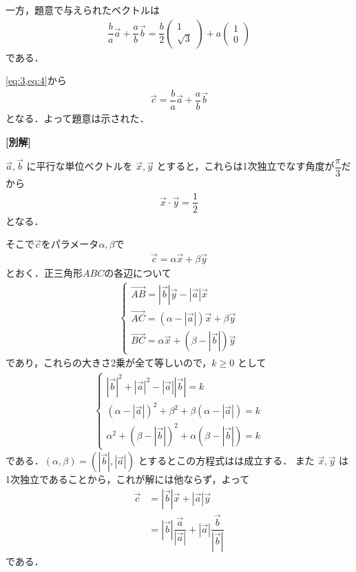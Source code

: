 \documentclass[../../main.tex]{subfiles}
\begin{document}
一方，題意で与えられたベクトルは
\begin{align}
  \dfrac{b}{a}\vec{a} + \dfrac{a}{b}\vec{b} = \dfrac{b}{2}
  \begin{pmatrix} 1 \\ \sqrt{3}
  \end{pmatrix} + a
  \begin{pmatrix} 1 \\ 0
  \end{pmatrix} \label{eq:4}
\end{align}
である．

\cref{eq:3,eq:4}から
\begin{align}
  \vec{c} = \dfrac{b}{a}\vec{a} + \dfrac{a}{b}\vec{b}
\end{align}
となる．よって題意は示された．

{\bf [別解]}

$\vec{a}, \vec{b}$ に平行な単位ベクトルを $\vec{x}, \vec{y}$ とすると，これらは1次独立でなす角度が$\dfrac{\pi}{3}$だから
\begin{align}
  \vec{x} \cdot \vec{y} = \dfrac{1}{2} \label{eq:5}
\end{align}
となる．

そこで$\vec{c}$をパラメータ$\alpha,\beta$で
\begin{align}
  \vec{c} = \alpha \vec{x} + \beta \vec{y}
\end{align}
とおく．正三角形$ABC$の各辺について
\begin{align}
  \begin{cases}
    \overrightarrow{AB} = |\vec{b}|\vec{y} - |\vec{a}|\vec{x} \\
    \overrightarrow{AC} = (\alpha - |\vec{a}|)\vec{x} + \beta \vec{y} \\
    \overrightarrow{BC} = \alpha \vec{x} + (\beta - |\vec{b}|)\vec{y}
  \end{cases}
\end{align}
であり，これらの大きさ2乗が全て等しいので，$k \ge 0$ として
\begin{align}
  \begin{cases}
    |\vec{b}|^2 + |\vec{a}|^2 - |\vec{a}||\vec{b}| = k \\
    (\alpha - |\vec{a}|)^2 + \beta^2 + \beta(\alpha - |\vec{a}|) = k \\
    \alpha^2 + (\beta - |\vec{b}|)^2 + \alpha(\beta - |\vec{b}|) = k
  \end{cases}
\end{align}
である．$(\alpha, \beta) = (|\vec{b}|, |\vec{a}|)$ とするとこの方程式はは成立する．
また $\vec{x}, \vec{y}$ は1次独立であることから，これが解には他ならず，よって
\begin{align}
  \vec{c} &= |\vec{b}|\vec{x} + |\vec{a}|\vec{y} \\
  &= |\vec{b}|\dfrac{\vec{a}}{|\vec{a}|} + |\vec{a}|\dfrac{\vec{b}}{|\vec{b}|}
\end{align}
である．

\newpage
\end{document}
